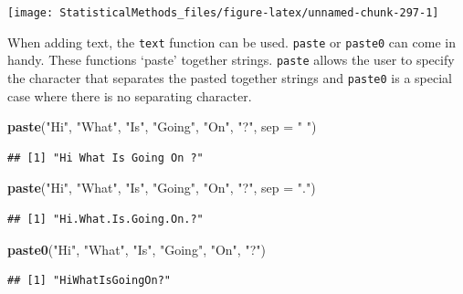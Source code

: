 \documentclass[
]{book}
\newenvironment{Shaded}{\begin{snugshade}}{\end{snugshade}}
\newcommand{\DataTypeTok}[1]{\textcolor[rgb]{0.13,0.29,0.53}{#1}}
\newcommand{\KeywordTok}[1]{\textcolor[rgb]{0.13,0.29,0.53}{\textbf{#1}}}
\newcommand{\NormalTok}[1]{#1}
\newcommand{\StringTok}[1]{\textcolor[rgb]{0.31,0.60,0.02}{#1}}
\theoremstyle{definition}
\theoremstyle{definition}
\theoremstyle{definition}
\theoremstyle{remark}
\begin{document}
\begin{center}\texttt{[image: StatisticalMethods\_files/figure-latex/unnamed-chunk-297-1]} \end{center}

When adding text, the \texttt{text} function can be used. \texttt{paste} or \texttt{paste0} can come in handy. These functions `paste' together strings. \texttt{paste} allows the user to specify the character that separates the pasted together strings and \texttt{paste0} is a special case where there is no separating character.

\begin{Shaded}
\begin{Highlighting}[]
\KeywordTok{paste}\NormalTok{(}\StringTok{"Hi"}\NormalTok{, }\StringTok{"What"}\NormalTok{, }\StringTok{"Is"}\NormalTok{, }\StringTok{"Going"}\NormalTok{, }\StringTok{"On"}\NormalTok{, }\StringTok{"?"}\NormalTok{, }\DataTypeTok{sep =} \StringTok{" "}\NormalTok{)}
\end{Highlighting}
\end{Shaded}

\begin{verbatim}
## [1] "Hi What Is Going On ?"
\end{verbatim}

\begin{Shaded}
\begin{Highlighting}[]
\KeywordTok{paste}\NormalTok{(}\StringTok{"Hi"}\NormalTok{, }\StringTok{"What"}\NormalTok{, }\StringTok{"Is"}\NormalTok{, }\StringTok{"Going"}\NormalTok{, }\StringTok{"On"}\NormalTok{, }\StringTok{"?"}\NormalTok{, }\DataTypeTok{sep =} \StringTok{"."}\NormalTok{)}
\end{Highlighting}
\end{Shaded}

\begin{verbatim}
## [1] "Hi.What.Is.Going.On.?"
\end{verbatim}

\begin{Shaded}
\begin{Highlighting}[]
\KeywordTok{paste0}\NormalTok{(}\StringTok{"Hi"}\NormalTok{, }\StringTok{"What"}\NormalTok{, }\StringTok{"Is"}\NormalTok{, }\StringTok{"Going"}\NormalTok{, }\StringTok{"On"}\NormalTok{, }\StringTok{"?"}\NormalTok{)}
\end{Highlighting}
\end{Shaded}

\begin{verbatim}
## [1] "HiWhatIsGoingOn?"
\end{verbatim}
\end{document}
